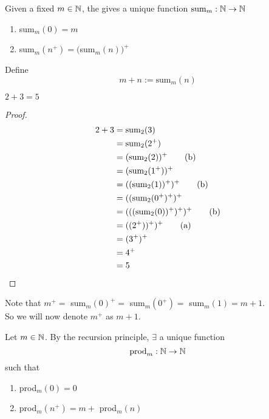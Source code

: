 \documentclass[12pt]{article}
\begin{document}
\begin{defn} \label{defn:addn}
    Given a fixed $m \in \mathbb{N}$, the  gives a unique function $\text{sum}_{m} : \mathbb{N} \to \mathbb{N}$
    \begin{enumerate}[label=(\alph*)]
        \item sum$_{m} (0) = m$ 
        \item sum$_{m} (n^{+}) = ($sum$_{m}(n))^{+}$
    \end{enumerate}
    Define \[
        m + n := \text{sum}_{m}(n)
    \]
\end{defn}

\begin{prop} \label{prop:2+3=5}
    $2 + 3 = 5$
\end{prop}
\begin{proof}
    \begin{align*}
        2 + 3 &= \text{sum}_{2}(3) \\
        &= \text{sum}_{2}(2^{+}) \\
        &= (\text{sum}_{2}(2))^{+} \tag{b}\\
        &= (\text{sum}_{2}(1^{+}))^{+} \\
        &= ((\text{sum}_{2}(1))^{+})^{+} \tag{b}\\
        &= ((\text{sum}_{2}(0^{+})^{+})^{+} \\
        &= (((\text{sum}_{2}(0))^{+})^{+})^{+} \tag{b}\\
        &= ((2^{+}))^{+})^{+} \tag{a}\\
        &= (3^{+})^{+} \\
        &= 4^{+} \\
        &= 5 \qedhere
    \end{align*}
\end{proof}

\begin{rem}
    Note that $m^{+} =$ sum$_{m}(0)^{+} = $ sum$_{m}(0^{+}) = $ sum$_{m}(1) = m + 1$. \\
    So we will now denote $m^{+}$ as $m + 1$.
\end{rem}

\begin{defn} \label{defn:mult}
    Let $m \in \mathbb{N}$. By the recursion principle, $\exists$ a unique function
    \[
        \text{prod}_{m} : \mathbb{N} \to \mathbb{N}
    \]
    such that
    \begin{enumerate}[label=(\alph*)]
        \item prod$_{m}(0) = 0$
        \item prod$_{m}(n^{+}) = m + $ prod$_{m}(n)$
    \end{enumerate}
\end{defn}
\end{document}
